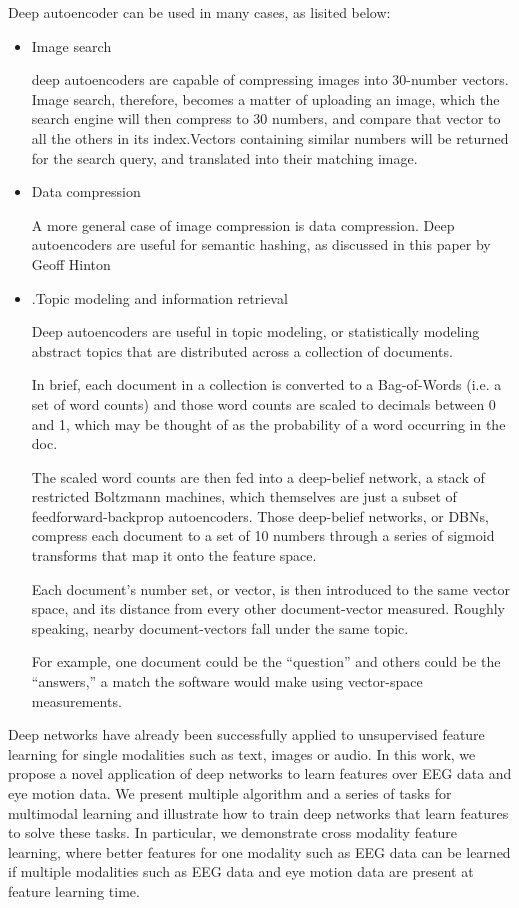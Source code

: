 Deep autoencoder can be used in many cases, as lisited below:
\begin{itemize}
\item Image search

	deep autoencoders are capable of compressing images into 30-number vectors. Image search, therefore, becomes a matter of uploading an image, which the search engine will then compress to 30 numbers, and compare that vector to all the others in its index.Vectors containing similar numbers will be returned for the search query, and translated into their matching image.
\item Data compression

	A more general case of image compression is data compression. Deep autoencoders are useful for semantic hashing, as discussed in this paper by Geoff Hinton
\item .Topic modeling and information retrieval 

	Deep autoencoders are useful in topic modeling, or statistically modeling abstract topics that are distributed across a collection of documents.

	In brief, each document in a collection is converted to a Bag-of-Words (i.e. a set of word counts) and those word counts are scaled to decimals between 0 and 1, which may be thought of as the probability of a word occurring in the doc.
	
	The scaled word counts are then fed into a deep-belief network, a stack of restricted Boltzmann machines, which themselves are just a subset of feedforward-backprop autoencoders. Those deep-belief networks, or DBNs, compress each document to a set of 10 numbers through a series of sigmoid transforms that map it onto the feature space.
	
	Each document’s number set, or vector, is then introduced to the same vector space, and its distance from every other document-vector measured. Roughly speaking, nearby document-vectors fall under the same topic.
	
	For example, one document could be the “question” and others could be the “answers,” a match the software would make using vector-space measurements.
\end{itemize}

	Deep networks have already been successfully applied to unsupervised feature learning for single modalities such as text, images or audio. In this work, we propose a novel application of deep networks to learn features over EEG data and eye motion data. We present multiple algorithm and a series of tasks for multimodal learning and illustrate how to train deep networks that learn features to solve these tasks. In particular, we demonstrate cross modality feature learning, where better features for one modality such as EEG data can be learned if multiple modalities such as EEG data and eye motion data are present at feature learning time. 

